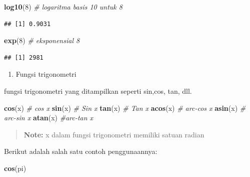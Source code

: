 \documentclass[]{book}
\newenvironment{Shaded}{\begin{snugshade}}{\end{snugshade}}
\newcommand{\KeywordTok}[1]{\textcolor[rgb]{0.13,0.29,0.53}{\textbf{#1}}}
\newcommand{\DecValTok}[1]{\textcolor[rgb]{0.00,0.00,0.81}{#1}}
\newcommand{\CommentTok}[1]{\textcolor[rgb]{0.56,0.35,0.01}{\textit{#1}}}
\newcommand{\NormalTok}[1]{#1}
\providecommand{\tightlist}{%
  \setlength{\itemsep}{0pt}\setlength{\parskip}{0pt}}
\begin{document}
\begin{Shaded}
\begin{Highlighting}[]
\KeywordTok{log10}\NormalTok{(}\DecValTok{8}\NormalTok{) }\CommentTok{# logaritma basis 10 untuk 8}
\end{Highlighting}
\end{Shaded}

\begin{verbatim}
## [1] 0.9031
\end{verbatim}

\begin{Shaded}
\begin{Highlighting}[]
\KeywordTok{exp}\NormalTok{(}\DecValTok{8}\NormalTok{) }\CommentTok{# eksponensial 8}
\end{Highlighting}
\end{Shaded}

\begin{verbatim}
## [1] 2981
\end{verbatim}

\begin{enumerate}
\def\labelenumi{\arabic{enumi}.}
\setcounter{enumi}{1}
\tightlist
\item
  Fungsi trigonometri
\end{enumerate}

fungsi trigonometri yang ditampilkan seperti sin,cos, tan, dll.

\begin{Shaded}
\begin{Highlighting}[]
\KeywordTok{cos}\NormalTok{(x) }\CommentTok{# cos x}
\KeywordTok{sin}\NormalTok{(x) }\CommentTok{# Sin x}
\KeywordTok{tan}\NormalTok{(x) }\CommentTok{# Tan x}
\KeywordTok{acos}\NormalTok{(x) }\CommentTok{# arc-cos x}
\KeywordTok{asin}\NormalTok{(x) }\CommentTok{# arc-sin x}
\KeywordTok{atan}\NormalTok{(x) }\CommentTok{#arc-tan x}
\end{Highlighting}
\end{Shaded}

\begin{quote}
\textbf{Note: } x dalam fungsi trigonometri memiliki satuan radian
\end{quote}

Berikut adalah salah satu contoh penggunaannya:

\begin{Shaded}
\begin{Highlighting}[]
\KeywordTok{cos}\NormalTok{(pi)}
\end{Highlighting}
\end{Shaded}
\end{document}
